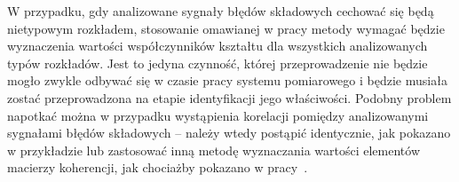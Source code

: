 W przypadku, gdy analizowane sygnały błędów składowych cechować się będą nietypowym rozkładem, stosowanie omawianej w pracy metody wymagać będzie wyznaczenia wartości współczynników kształtu dla wszystkich analizowanych typów rozkładów. Jest to jedyna czynność, której przeprowadzenie nie będzie mogło zwykle odbywać się w czasie pracy systemu pomiarowego i będzie musiała zostać przeprowadzona na etapie identyfikacji jego właściwości. Podobny problem napotkać można w przypadku wystąpienia korelacji pomiędzy analizowanymi sygnałami błędów składowych -- należy wtedy postąpić identycznie, jak pokazano w przykładzie lub zastosować inną metodę wyznaczania wartości elementów macierzy koherencji, jak chociażby pokazano w pracy~\cite{jakubiec_reductive}.
